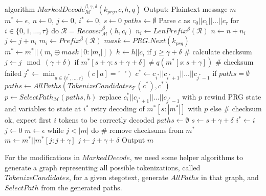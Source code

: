 \begin{Pseudocode}[caption={
Marked Decode Algorithm.
In comparison to Meteor's $Decode$ algorithm, MarkedDecode checks the checksum every $\gamma$ bits. 
If the checksum does not match, a decoding error happened.
We then perform a lookbehind on the stegotext and generate all possible tokenizations $paths$ for a substring of $c$.
Afterwards, rewind the internal state and retry decoding with a path $p$ selected from $paths$.
}, label={alg:marked-decode}]
algorithm $MarkedDecode_{\mathcal{M}}^{\beta,\gamma,\delta}(k_{prg}, c, h, q)$
	Output: Plaintext message $m$
	$m^* \leftarrow \epsilon,~ n \leftarrow 0,~ j \leftarrow 0,~ i^* \leftarrow 0,~ s \leftarrow 0$
	$paths \leftarrow \emptyset$
	Parse $c$ as $c_0 || c_1 || \dots || c_{\tau}$
	for $i \in \{ 0, 1, \dots, \tau \}$ do
		$\mathcal{R} = Recover_{\mathcal{M}}^\beta(h, c_i)$
		$n_i \leftarrow LenPrefix^\beta(\mathcal{R})$
		$n \leftarrow n + n_i$
		$j \leftarrow j + n_i$
		$m_i \leftarrow Prefix^\beta(\mathcal{R})$
		$mask \leftarrow PRG.Next(k_{prg})$
		$m^* \leftarrow m^* || (m_i \oplus mask[0: |m_i|])$
		$h \leftarrow h||c_i$
		if $j \geq \gamma + \delta$
			# calculate checksum
			$j \leftarrow j \mod (\gamma+\delta)$
			if $m^*[s+\gamma:s+\gamma+\delta] \neq q(m^*[s:s+\gamma])$  # checksum failed
				$j^* \leftarrow \min_{a \in \{ i^*, \dots, \tau \}} (c[a] = \textrm{'~ '})$
				$c^* \leftarrow c_{i^*} || c_{i^*+1} || \dots || c_{j^*-1}$
				if $paths = \emptyset$
					$paths \leftarrow AllPaths(TokenizeCandidates_{\mathcal{T}}(c^*), c^*)$
				$p \leftarrow SelectPath_{\mathcal{M}}(paths, h)$
				replace $c_i^*||c_{i^*+1}||\dots||c_{j^*-1}$ with $p$
				rewind PRG state and variables to state at $i^*$
				retry decoding of $m^*[s:|m^*|]$ with $p$
			else  # checksum ok, expect first $i$ tokens to be correctly decoded
				$paths \leftarrow \emptyset$
				$s \leftarrow s + \gamma + \delta$
				$i^* \leftarrow i$
	$j \leftarrow 0$
	$m \leftarrow \epsilon$
	while $j < |m|$ do  # remove checksums from $m^*$
		$m \leftarrow m^* || m^*[j: j + \gamma]$
		$j \leftarrow j + \gamma + \delta$
	Output $m$
\end{Pseudocode}

For the modifications in $MarkedDecode$, we need some helper algorithms to generate a graph representing all possible tokenizations, called $TokenizeCandidates$, for a given stegotext, generate $AllPaths$ in that graph, and $SelectPath$ from the generated paths.

